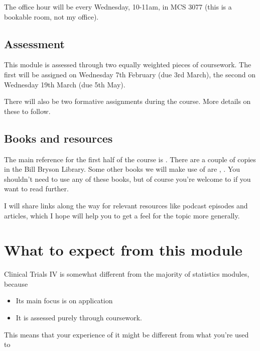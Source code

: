 \documentclass[
  openany]{book}
\providecommand{\tightlist}{%
  \setlength{\itemsep}{0pt}\setlength{\parskip}{0pt}}
\theoremstyle{definition}
\theoremstyle{definition}
\theoremstyle{definition}
\theoremstyle{definition}
\theoremstyle{remark}
\begin{document}
The office hour will be every Wednesday, 10-11am, in MCS 3077 (this is a bookable room, not my office).

\subsection*{Assessment}\label{assessment}

This module is assessed through two equally weighted pieces of coursework. The first will be assigned on Wednesday 7th February (due 3rd March), the second on Wednesday 19th March (due 5th May).

There will also be two formative assignments during the course. More details on these to follow.

\subsection*{Books and resources}\label{books-and-resources}

The main reference for the first half of the course is \citet{matthews2006introduction}. There are a couple of copies in the Bill Bryson Library. Some other books we will make use of are \citet{hulley2013designing}, \citet{hayes2017cluster}. You shouldn't need to use any of these books, but of course you're welcome to if you want to read further.

I will share links along the way for relevant resources like podcast episodes and articles, which I hope will help you to get a feel for the topic more generally.

\section*{What to expect from this module}\label{what-to-expect-from-this-module}

Clinical Trials IV is somewhat different from the majority of statistics modules, because

\begin{itemize}
\tightlist
\item
  Its main focus is on application
\item
  It is assessed purely through coursework.
\end{itemize}

This means that your experience of it might be different from what you're used to
\end{document}
